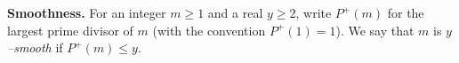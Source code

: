 \medskip
\noindent\textbf{Smoothness.}
For an integer $m\ge 1$ and a real $y\ge 2$, write $P^+(m)$ for the largest prime divisor of $m$ (with the convention $P^+(1)=1$). We say that $m$ is \emph{$y$--smooth} if $P^+(m)\le y$.
